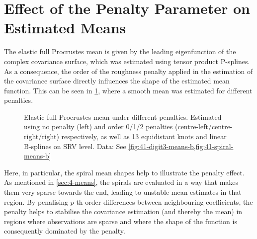 \section{Effect of the Penalty Parameter on Estimated Means}
\label{sec:4-penalty}
The elastic full Procrustes mean is given by the leading eigenfunction of the complex covariance surface, which was estimated using tensor product P-splines.
As a consequence, the order of the roughness penalty applied in the estimation of the covariance surface directly influences the shape of the estimated mean function.
This can be seen in \cref{fig:4-penalty}, where a smooth mean was estimated for different penalties.
\begin{figure}
  \centering
  \begin{subfigure}{\textwidth}
  \end{subfigure}
  \begin{subfigure}{\textwidth}
  \end{subfigure}
  \caption{Elastic full Procrustes mean under different penalties.
  Estimated using no penalty (left) and order 0/1/2 penalties (centre-left/centre-right/right) respectively, as well as 13 equidistant knots and linear B-splines on SRV level.
  Data: See \cref{fig:41-digit3-means-b,fig:41-spiral-means-b}}
  \label{fig:4-penalty}
\end{figure}
Here, in particular, the spiral mean shapes help to illustrate the penalty effect.
As mentioned in \cref{sec:4-means}, the spirals are evaluated in a way that makes them very sparse towards the end, leading to unstable mean estimates in that region.
By penalising $p$-th order differences between neighbouring coefficients, the penalty helps to stabilise the covariance estimation (and thereby the mean) in regions where observations are sparse and where the shape of the function is consequently dominated by the penalty.

